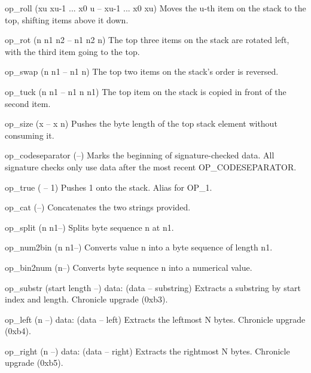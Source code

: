 \documentclass[a4paper, 11pt, openany]{book}
\begin{document}
\begin{forthbox}
  op_roll          (xu xu-1 ... x0 u -- xu-1 ... x0 xu)
                   Moves the u-th item on the stack to the top,
                   shifting items above it down.

  op_rot           (n n1 n2 -- n1 n2 n)
                   The top three items on the stack are rotated
                   left, with the third item going to the top.

  op_swap          (n n1 -- n1 n)
                   The top two items on the stack's order is
                   reversed.

  op_tuck          (n n1 -- n1 n n1)
                   The top item on the stack is copied in front
                   of the second item.
\end{forthbox}

\begin{forthbox}
  op_size           (x -- x n)
                    Pushes the byte length of the top stack element
                    without consuming it.

  op_codeseparator  (--)
                    Marks the beginning of signature-checked data.
                    All signature checks only use data after the
                    most recent OP\_CODESEPARATOR.

  op_true           ( -- 1)
                    Pushes 1 onto the stack. Alias for OP\_1.
\end{forthbox}

\begin{forthbox}
  op_cat      (--)
              Concatenates the two strings provided.

  op_split    (n n1--)
              Splits byte sequence n at n1.

  op_num2bin  (n n1--)
              Converts value n into a byte sequence of length n1.

  op_bin2num  (n--)
              Converts byte sequence n into a numerical value.

  op_substr   (start length --) data: (data -- substring)
              Extracts a substring by start index and length.
              Chronicle upgrade (0xb3).

  op_left     (n --) data: (data -- left)
              Extracts the leftmost N bytes.
              Chronicle upgrade (0xb4).

  op_right    (n --) data: (data -- right)
              Extracts the rightmost N bytes.
              Chronicle upgrade (0xb5).
\end{forthbox}
\end{document}
